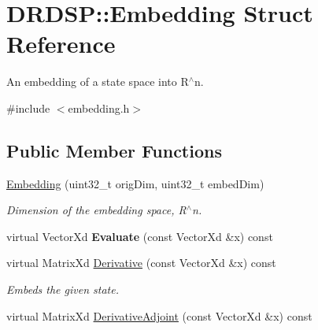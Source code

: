 \hypertarget{struct_d_r_d_s_p_1_1_embedding}{\section{D\-R\-D\-S\-P\-:\-:Embedding Struct Reference}
\label{struct_d_r_d_s_p_1_1_embedding}
}


An embedding of a state space into R$^\wedge$n.  




{\ttfamily \#include $<$embedding.\-h$>$}

\subsection*{Public Member Functions}
\begin{DoxyCompactItemize}
\item 
\hypertarget{struct_d_r_d_s_p_1_1_embedding_a044e60ce685c03b1e31a080455a47a43}{\hyperlink{struct_d_r_d_s_p_1_1_embedding_a044e60ce685c03b1e31a080455a47a43}{Embedding} (uint32\-\_\-t orig\-Dim, uint32\-\_\-t embed\-Dim)}\label{struct_d_r_d_s_p_1_1_embedding_a044e60ce685c03b1e31a080455a47a43}

\begin{DoxyCompactList}\small\item\em Dimension of the embedding space, R$^\wedge$n. \end{DoxyCompactList}\item 
\hypertarget{struct_d_r_d_s_p_1_1_embedding_a128ada65c8aafc9348dafd8c89add0da}{virtual Vector\-Xd {\bfseries Evaluate} (const Vector\-Xd \&x) const }\label{struct_d_r_d_s_p_1_1_embedding_a128ada65c8aafc9348dafd8c89add0da}

\item 
\hypertarget{struct_d_r_d_s_p_1_1_embedding_a18d562ec89da43df7dd66b1b8b694e85}{virtual Matrix\-Xd \hyperlink{struct_d_r_d_s_p_1_1_embedding_a18d562ec89da43df7dd66b1b8b694e85}{Derivative} (const Vector\-Xd \&x) const }\label{struct_d_r_d_s_p_1_1_embedding_a18d562ec89da43df7dd66b1b8b694e85}

\begin{DoxyCompactList}\small\item\em Embeds the given state. \end{DoxyCompactList}\item 
\hypertarget{struct_d_r_d_s_p_1_1_embedding_a010327f5b83006a24e466deabad5a852}{virtual Matrix\-Xd \hyperlink{struct_d_r_d_s_p_1_1_embedding_a010327f5b83006a24e466deabad5a852}{Derivative\-Adjoint} (const Vector\-Xd \&x) const }\label{struct_d_r_d_s_p_1_1_embedding_a010327f5b83006a24e466deabad5a852}


\end{DoxyCompactItemize}
